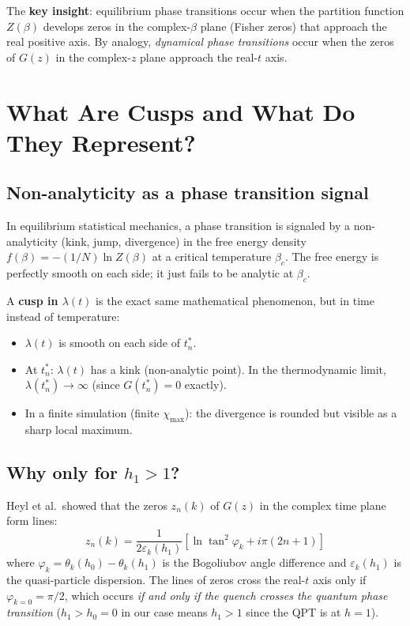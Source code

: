 \documentclass[11pt, a4paper]{article}
\begin{document}
The \textbf{key insight}: equilibrium phase transitions occur when the partition function $Z(\beta)$ develops zeros in the complex-$\beta$ plane (Fisher zeros) that approach the real positive axis. By analogy, \emph{dynamical phase transitions} occur when the zeros of $G(z)$ in the complex-$z$ plane approach the real-$t$ axis.

\section{What Are Cusps and What Do They Represent?}
\label{sec:cusps}

\subsection{Non-analyticity as a phase transition signal}

In equilibrium statistical mechanics, a phase transition is signaled by a non-analyticity (kink, jump, divergence) in the free energy density $f(\beta) = -(1/N)\ln Z(\beta)$ at a critical temperature $\beta_c$. The free energy is perfectly smooth on each side; it just fails to be analytic at $\beta_c$.

A \textbf{cusp in $\lambda(t)$} is the exact same mathematical phenomenon, but in time instead of temperature:
\begin{itemize}
  \item $\lambda(t)$ is smooth on each side of $t^*_n$.
  \item At $t^*_n$: $\lambda(t)$ has a kink (non-analytic point). In the thermodynamic limit, $\lambda(t^*_n) \to \infty$ (since $G(t^*_n) = 0$ exactly).
  \item In a finite simulation (finite $\chi_{\max}$): the divergence is rounded but visible as a sharp local maximum.
\end{itemize}

\subsection{Why only for $h_1 > 1$?}

Heyl et al.\ showed that the zeros $z_n(k)$ of $G(z)$ in the complex time plane form lines:
\begin{equation}
  z_n(k) = \frac{1}{2\varepsilon_k(h_1)} \left[\ln\tan^2\varphi_k + i\pi(2n+1)\right]
\end{equation}
where $\varphi_k = \theta_k(h_0) - \theta_k(h_1)$ is the Bogoliubov angle difference and $\varepsilon_k(h_1)$ is the quasi-particle dispersion. The lines of zeros cross the real-$t$ axis only if $\varphi_{k=0} = \pi/2$, which occurs \emph{if and only if the quench crosses the quantum phase transition} ($h_1 > h_0 = 0$ in our case means $h_1 > 1$ since the QPT is at $h = 1$).
\end{document}
